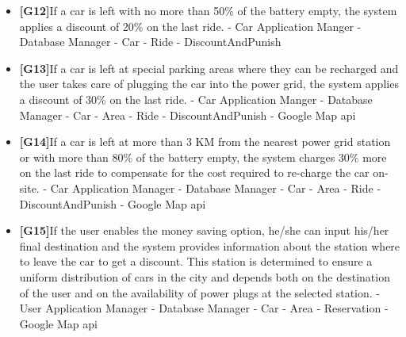 \documentclass{article}
\begin{document}
\begin{itemize}
		\item\textbf{[G12]}If a car is left with no more than 50\% of the battery empty, the system applies a discount of 20\% on the last ride.
		\newline - Car Application Manger 
		\newline - Database Manager 
		\newline - Car
		\newline - Ride
		\newline - DiscountAndPunish
		
		\item\textbf{[G13]}If a car is left at special parking areas where they can be recharged and the user takes care of plugging the car into the power grid, the system applies a discount of 30\% on the last ride.
		\newline - Car Application Manger 
		\newline - Database Manager 
		\newline - Car
		\newline - Area
		\newline - Ride
		\newline - DiscountAndPunish
		\newline - Google Map api
		
		\item\textbf{[G14]}If a car is left at more than 3 KM from the nearest power grid station or with more than 80\% of the battery empty, the system charges 30\% more on the last ride to compensate for the cost required to re-charge the car on-site.
		\newline - Car Application Manager
		\newline - Database Manager
		\newline - Car 
		\newline - Area
		\newline - Ride
		\newline - DiscountAndPunish
		\newline - Google Map api
		
		\item\textbf{[G15]}If the user enables the money saving option, he/she can input his/her final destination and the system provides information about the station where to leave the car to get a discount. This station is determined to ensure a uniform distribution of cars in the city and depends both on the destination of the user and on the availability of power plugs at the selected station.
		\newline - User Application Manager
		\newline - Database Manager
		\newline - Car
		\newline - Area
		\newline - Reservation
		\newline - Google Map api
		
		
		
	\end{itemize}
	\newpage
\end{document}
